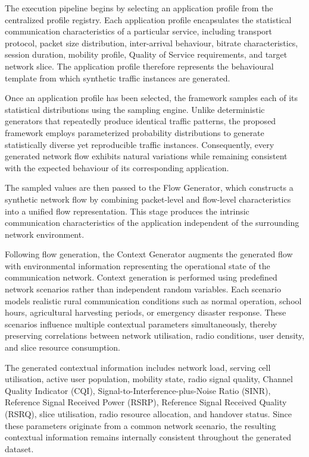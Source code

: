 \documentclass[12pt,a4paper]{article}
\begin{document}
The execution pipeline begins by selecting an application profile from the centralized profile registry. Each application profile encapsulates the statistical communication characteristics of a particular service, including transport protocol, packet size distribution, inter-arrival behaviour, bitrate characteristics, session duration, mobility profile, Quality of Service requirements, and target network slice. The application profile therefore represents the behavioural template from which synthetic traffic instances are generated.

Once an application profile has been selected, the framework samples each of its statistical distributions using the sampling engine. Unlike deterministic generators that repeatedly produce identical traffic patterns, the proposed framework employs parameterized probability distributions to generate statistically diverse yet reproducible traffic instances. Consequently, every generated network flow exhibits natural variations while remaining consistent with the expected behaviour of its corresponding application.

The sampled values are then passed to the Flow Generator, which constructs a synthetic network flow by combining packet-level and flow-level characteristics into a unified flow representation. This stage produces the intrinsic communication characteristics of the application independent of the surrounding network environment.

Following flow generation, the Context Generator augments the generated flow with environmental information representing the operational state of the communication network. Context generation is performed using predefined network scenarios rather than independent random variables. Each scenario models realistic rural communication conditions such as normal operation, school hours, agricultural harvesting periods, or emergency disaster response. These scenarios influence multiple contextual parameters simultaneously, thereby preserving correlations between network utilisation, radio conditions, user density, and slice resource consumption.

The generated contextual information includes network load, serving cell utilisation, active user population, mobility state, radio signal quality, Channel Quality Indicator (CQI), Signal-to-Interference-plus-Noise Ratio (SINR), Reference Signal Received Power (RSRP), Reference Signal Received Quality (RSRQ), slice utilisation, radio resource allocation, and handover status. Since these parameters originate from a common network scenario, the resulting contextual information remains internally consistent throughout the generated dataset.
\end{document}
